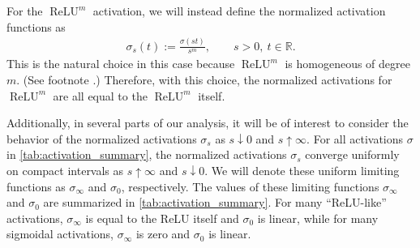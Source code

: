 \documentclass{article}
\DeclareMathOperator{\ReLU}{\mathrm{ReLU}}
\newcommand{\R}{\mathbb{R}}
\begin{document}
For the $\ReLU^m$ activation, we will instead define the normalized activation functions as
\begin{align} \label{eq:normalized_activations_relu_m}
    \sigma_s(t) := \frac{\sigma(st)}{s^m}, \qquad s >0, \ t \in \R.
\end{align}
This is the natural choice in this case because $\ReLU^m$ is homogeneous of degree $m$. (See footnote .) Therefore, with this choice, the normalized activations for $\ReLU^m$ are all equal to the $\ReLU^m$ itself.

Additionally, in several parts of our analysis, it will be of interest to consider the behavior of the normalized activations $\sigma_s$ as $s \downarrow 0$ and $s \uparrow \infty$. For all activations $\sigma$ in \cref{tab:activation_summary}, the normalized activations $\sigma_s$ converge uniformly on compact intervals as $s \uparrow \infty$ and $s \downarrow 0$. We will denote these uniform limiting functions as $\sigma_\infty$ and $\sigma_0$, respectively. The values of these limiting functions $\sigma_\infty$ and $\sigma_0$ are summarized in \cref{tab:activation_summary}. For many ``ReLU-like'' activations, $\sigma_\infty$ is equal to the ReLU itself and $\sigma_0$ is linear, while for many sigmoidal activations, $\sigma_\infty$ is zero and $\sigma_0$ is linear.
\end{document}
